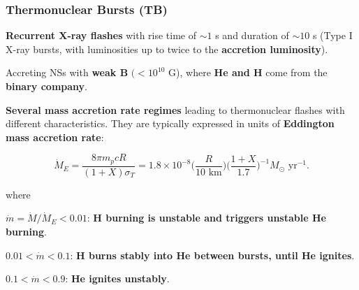 \begin{frame}
\frametitle{Thermonuclear Bursts (TB)}
	  \begin{enumerate}\scriptsize{ 
	   \item {\bf Recurrent X-ray flashes} with rise time of $\sim 1$ s and duration of $\sim 10$ s  (Type I X-ray bursts, with luminosities up to twice to the {\bf accretion luminosity}).
	   
	   \quad
	   
	      \item Accreting NSs with  {\bf weak B} $(<10^{10}$ G), where {\bf He and H} come from the {\bf binary company}.
	   
	  
	   
	   \quad
	   
	   \item {\bf Several mass accretion rate regimes} leading to thermonuclear flashes with different characteristics. They are typically expressed in units of {\bf Eddington mass accretion rate}:
	  
	  $$\dot M_E = \frac{8 \pi m_p cR}{(1+X)\sigma_T} = 1.8 \times 10^{-8} \Big (\frac{R}{10 \mbox{ km}} \Big ) \Big (\frac{1+X}{1.7}\Big)^{-1} M_{\odot} \mbox{ yr}^{-1}.$$
	  
	where
	  
	  \begin{itemize}\scriptsize{ 
	   \item $\dot m = \dot M/\dot M_E <0.01$: {\bf H burning is unstable and triggers unstable He burning}.
	   \item $0.01< \dot m < 0.1$: {\bf H burns stably into He  between bursts, until He ignites}.
	   \item $0.1< \dot m<0.9$: {\bf He ignites unstably}. }
	  \end{itemize}
}
	  \end{enumerate}
\end{frame}


